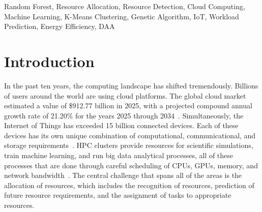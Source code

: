 \documentclass[conference]{IEEEtran}
\begin{document}
\begin{abstract}
The challenge of identifying and effectively managing resource distribution within cloud computing, IoT ecosystems, and edge platforms, which currently support billions of users, remains unresolved. Traditional allocation methods, such as first-fit, round-robin, and threshold-based auto-scaling, are unable to address the intricacies of varying, multi-dimensional workloads. This paper introduces the AIRDA framework. AIRDA is the first practical AI-based system that applies Random Forest ensemble classification and K-Means clustering to dynamically assess and allocate computing resources in real time. This system is made up of three layers: a Resource Detection Layer that tracks utilization of CPU, memory, bandwidth, and storage; an Intelligent Decision Layer in which a K-Means profiler clusters workloads and a GA-optimized Random Forest classifier predicts demand; and an Allocation Execution Layer that aligns predictions to SLA-aware resource policies. The GA-RF model is demonstrated to be the best performing model out of the three methods, achieving 98.3\% classification accuracy and 98.3\% F1-score, and is the only model that demonstrates a SLA violation rate as low as 2.8\%. In addition, the GA-RF model demonstrated a reduction of 45\% in allocation latency compared to threshold-based methods. It is also demonstrated that the framework retains a minimum of 87\% accuracy in cross-domain evaluations on cloud VM scheduling.

\end{abstract}

\renewcommand\IEEEkeywordsname{Keywords}
\begin{IEEEkeywords}
Random Forest, Resource Allocation, Resource Detection, Cloud Computing, Machine Learning, K-Means Clustering, Genetic Algorithm, IoT, Workload Prediction, Energy Efficiency, DAA
\end{IEEEkeywords}

\section{\textbf{Introduction}}
In the past ten years, the computing landscape has shifted tremendously. Billions of users around the world are using cloud platforms. The global cloud market estimated a value of \$912.77 billion in 2025, with a projected compound annual growth rate of 21.20\% for the years 2025 through 2034~\cite{Ref6}. Simultaneously, the Internet of Things has exceeded 15 billion connected devices. Each of these devices has its own unique combination of computational, communicational, and storage requirements~\cite{Ref1}. HPC clusters provide resources for scientific simulations, train machine learning, and run big data analytical processes, all of these processes that are done through careful scheduling of CPUs, GPUs, memory, and network bandwidth~\cite{Ref3}. The central challenge that spans all of the areas is the allocation of resources, which includes the recognition of resources, prediction of future resource requirements, and the assignment of tasks to appropriate resources.
\end{document}
